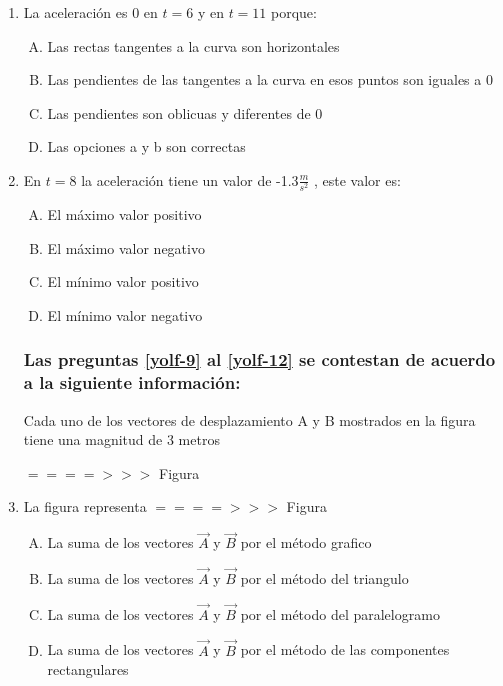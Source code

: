 \begin{enumerate}
\item  La aceleración es 0 en $t=6$ y en $t=11$ porque: \label{yolf-7}\\

\begin{enumerate}[(A)]
\item  Las rectas tangentes a la curva son horizontales
\item  Las pendientes de las tangentes a la curva en esos puntos son iguales a 0
\item  Las pendientes son oblicuas y diferentes de 0
\item  Las opciones a y b son correctas
\end{enumerate}

\item  En $t=8$ la aceleración tiene un valor de -1.3$\frac{m}{s^2}$ , este valor es: \label{yolf-8}\\

\begin{enumerate}[(A)]
\item  El máximo valor positivo
\item  El máximo valor negativo
\item  El mínimo valor positivo
\item  El mínimo valor negativo
\end{enumerate}


\subsubsection*{Las preguntas \ref{yolf-9} al \ref{yolf-12} se contestan de acuerdo a la siguiente información:}


\noindent Cada uno de los vectores de desplazamiento A y B mostrados en la figura tiene una magnitud de 3 metros

$====>>>$ Figura
\item  La figura representa 
$====>>>$ Figura\label{yolf-9}\\


\begin{enumerate}[(A)]
\item  La suma de los vectores $\vec{A}$  y $\vec{B}$ por el método grafico
\item  La suma de los vectores $\vec{A}$  y $\vec{B}$ por el método del triangulo
\item  La suma de los vectores $\vec{A}$  y $\vec{B}$ por el método del paralelogramo
\item  La suma de los vectores $\vec{A}$  y $\vec{B}$ por el método de las componentes rectangulares
\end{enumerate}


\end{enumerate}
